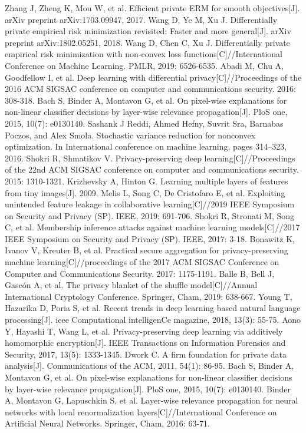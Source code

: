 \documentclass[12pt,openany,a4paper,fancyhdr,oneside]{ctexbook}
\begin{document}
\begin{thebibliography}{99}
Zhang J, Zheng K, Mou W, et al. Efficient private ERM for smooth objectives[J]. arXiv preprint arXiv:1703.09947, 2017.
Wang D, Ye M, Xu J. Differentially private empirical risk minimization revisited: Faster and more general[J]. arXiv preprint arXiv:1802.05251, 2018.
Wang D, Chen C, Xu J. Differentially private empirical risk minimization with non-convex loss functions[C]//International Conference on Machine Learning. PMLR, 2019: 6526-6535.
Abadi M, Chu A, Goodfellow I, et al. Deep learning with differential privacy[C]//Proceedings of the 2016 ACM SIGSAC conference on computer and communications security. 2016: 308-318.
Bach S, Binder A, Montavon G, et al. On pixel-wise explanations for non-linear classifier decisions by layer-wise relevance propagation[J]. PloS one, 2015, 10(7): e0130140.
Sashank J Reddi, Ahmed Hefny, Suvrit Sra, Barnabas Poczos, and Alex Smola. Stochastic variance reduction for nonconvex optimization. In International conference on machine learning, pages 314–323, 2016.
Shokri R, Shmatikov V. Privacy-preserving deep learning[C]//Proceedings of the 22nd ACM SIGSAC conference on computer and communications security. 2015: 1310-1321.
Krizhevsky A, Hinton G. Learning multiple layers of features from tiny images[J]. 2009.
Melis L, Song C, De Cristofaro E, et al. Exploiting unintended feature leakage in collaborative learning[C]//2019 IEEE Symposium on Security and Privacy (SP). IEEE, 2019: 691-706.
Shokri R, Stronati M, Song C, et al. Membership inference attacks against machine learning models[C]//2017 IEEE Symposium on Security and Privacy (SP). IEEE, 2017: 3-18.
Bonawitz K, Ivanov V, Kreuter B, et al. Practical secure aggregation for privacy-preserving machine learning[C]//proceedings of the 2017 ACM SIGSAC Conference on Computer and Communications Security. 2017: 1175-1191.
Balle B, Bell J, Gascón A, et al. The privacy blanket of the shuffle model[C]//Annual International Cryptology Conference. Springer, Cham, 2019: 638-667.
Young T, Hazarika D, Poria S, et al. Recent trends in deep learning based natural language processing[J]. ieee Computational intelligenCe magazine, 2018, 13(3): 55-75.
Aono Y, Hayashi T, Wang L, et al. Privacy-preserving deep learning via additively homomorphic encryption[J]. IEEE Transactions on Information Forensics and Security, 2017, 13(5): 1333-1345.
Dwork C. A firm foundation for private data analysis[J]. Communications of the ACM, 2011, 54(1): 86-95.
Bach S, Binder A, Montavon G, et al. On pixel-wise explanations for non-linear classifier decisions by layer-wise relevance propagation[J]. PloS one, 2015, 10(7): e0130140.
Binder A, Montavon G, Lapuschkin S, et al. Layer-wise relevance propagation for neural networks with local renormalization layers[C]//International Conference on Artificial Neural Networks. Springer, Cham, 2016: 63-71.

\end{thebibliography}


\pagestyle{plain}
\clearpage
{}
{}


\pagestyle{plain}
\clearpage
{}
{}



\printindex
\end{document}
